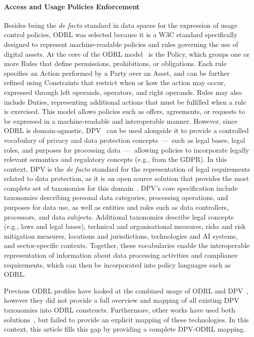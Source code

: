 \paragraph{Access and Usage Policies Enforcement}

Besides being the \emph{de facto} standard
in data spaces for the expression of usage control policies,
ODRL was selected because it is a W3C standard specifically designed to represent machine-readable policies and rules governing the use of digital assets. 
At the core of the ODRL model~\cite{iannella_odrl_2018} is the Policy, which groups one or more Rules that define permissions, prohibitions, or obligations. Each rule specifies an Action performed by a Party over an Asset, and can be further refined using Constraints that restrict when or how the action may occur, expressed through left operands, operators, and right operands. Rules may also include Duties, representing additional actions that must be fulfilled when a rule is exercised. This model allows policies such as offers, agreements, or requests to be expressed in a machine-readable and interoperable manner.
However, since ODRL is domain-agnostic, DPV~\cite{pandit_data_2024} can be used alongside it to provide a controlled vocabulary of privacy and data protection concepts~---~such as legal bases, legal roles, and purposes for processing data~---~allowing policies to incorporate legally relevant semantics and regulatory concepts (e.g., from the GDPR).
In this context,
DPV is the \emph{de facto} standard for 
the representation of legal requirements
related to data protection,
as it is an open source solution
that provides the most complete set of taxonomies
for this domain~\cite{esteves_analysis_2024}.
DPV's core specification include taxonomies describing personal data categories, processing operations, and purposes for data use, as well as entities and roles such as data controllers, processors, and data subjects. Additional taxonomies describe legal concepts (e.g., laws and legal bases), technical and organisational measures, risks and risk mitigation measures, locations and jurisdictions, technologies and AI systems, and sector-specific contexts. Together, these vocabularies enable the interoperable representation of information about data processing activities and compliance requirements, which can then be incorporated into policy languages such as ODRL.

Previous ODRL profiles have looked at the combined usage of ODRL and
DPV~\cite{esteves_odrl_2021,pandit_enhancing_2024,golpayegani_aiup_2024},
however they did not provide a full overview and mapping of
all existing DPV taxonomies into ODRL constructs.
Furthermore, 
other works have used both
solutions~\cite{esteves_semantic_2025,esteves_fostering_2022,plazaortiz_authentication_2025,papagiannakopoulou_semantic_2025,yumusak_data_2024,de_vos_odrl_2019},
but failed to provide an explicit mapping of these technologies.
In this context,
this article fills this gap
by providing a complete DPV-ODRL mapping.

